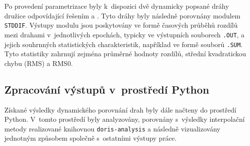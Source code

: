 Po provedení parametrizace byly k~dispozici dvě dynamicky popsané dráhy družice odpovídající řešením  a . Tyto dráhy byly následně porovnány modulem \texttt{STDDIF}. Výstupy modulu jsou poskytovány ve formě časových průběhů rozdílů mezi drahami v~jednotlivých epochách, typicky ve výstupních souborech \texttt{.OUT}, a jejich souhrnných statistických charakteristik, například ve formě souborů \texttt{.SUM}. Tyto statistiky zahrnují zejména průměrné hodnoty rozdílů, střední kvadratickou chybu (RMS) a RMS0.

\subsection{Zpracování výstupů v~prostředí Python}

Získané výsledky dynamického porovnání drah byly dále načteny do prostředí Python. V~tomto prostředí byly analyzovány, porovnány s~výsledky interpolační metody realizované knihovnou \texttt{doris-analysis} a následně vizualizovány jednotným způsobem společně s~ostatními výstupy práce.